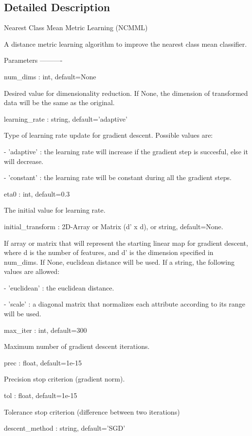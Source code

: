 \subsection{Detailed Description}
\begin{DoxyVerb}Nearest Class Mean Metric Learning (NCMML)

A distance metric learning algorithm to improve the nearest class mean classifier.

Parameters
----------

num_dims : int, default=None

    Desired value for dimensionality reduction. If None, the dimension of transformed data will be the same as the original.

learning_rate : string, default='adaptive'

    Type of learning rate update for gradient descent. Possible values are:

    - 'adaptive' : the learning rate will increase if the gradient step is succesful, else it will decrease.

    - 'constant' : the learning rate will be constant during all the gradient steps.

eta0 : int, default=0.3

    The initial value for learning rate.

initial_transform : 2D-Array or Matrix (d' x d), or string, default=None.

    If array or matrix that will represent the starting linear map for gradient descent, where d is the number of features,
    and d' is the dimension specified in num_dims.
    If None, euclidean distance will be used. If a string, the following values are allowed:

    - 'euclidean' : the euclidean distance.

    - 'scale' : a diagonal matrix that normalizes each attribute according to its range will be used.

max_iter : int, default=300

    Maximum number of gradient descent iterations.

prec : float, default=1e-15

    Precision stop criterion (gradient norm).

tol : float, default=1e-15

    Tolerance stop criterion (difference between two iterations)

descent_method : string, default='SGD'


\end{DoxyVerb}
